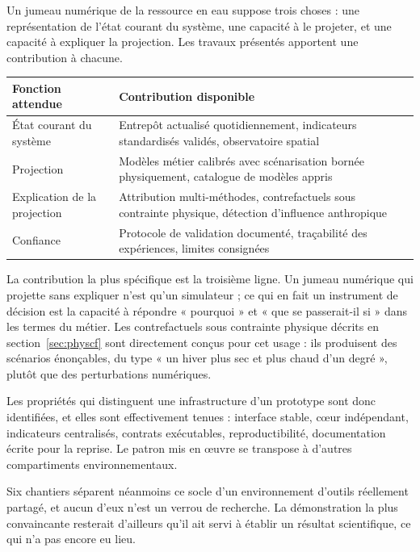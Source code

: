 Un jumeau numérique de la ressource en eau suppose trois choses : une représentation de l'état
courant du système, une capacité à le projeter, et une capacité à expliquer la projection. Les
travaux présentés apportent une contribution à chacune.

\begin{center}
\begin{tabularx}{\textwidth}{@{}lX@{}}
\toprule
\textbf{Fonction attendue} & \textbf{Contribution disponible} \\
\midrule
État courant du système & Entrepôt actualisé quotidiennement, indicateurs standardisés validés,
observatoire spatial \\
Projection & Modèles métier calibrés avec scénarisation bornée physiquement, catalogue de
modèles appris \\
Explication de la projection & Attribution multi-méthodes, contrefactuels sous contrainte
physique, détection d'influence anthropique \\
Confiance & Protocole de validation documenté, traçabilité des expériences, limites consignées \\
\bottomrule
\end{tabularx}
\end{center}

La contribution la plus spécifique est la troisième ligne. Un jumeau numérique qui projette sans
expliquer n'est qu'un simulateur ; ce qui en fait un instrument de décision est la capacité à
répondre « pourquoi » et « que se passerait-il si » dans les termes du métier. Les contrefactuels
sous contrainte physique décrits en section~\ref{sec:physcf} sont directement conçus pour cet
usage : ils produisent des scénarios énonçables, du type « un hiver plus sec et plus chaud d'un
degré », plutôt que des perturbations numériques.

Les propriétés qui distinguent une infrastructure d'un prototype sont donc identifiées, et elles
sont effectivement tenues : interface stable, cœur indépendant, indicateurs centralisés,
contrats exécutables, reproductibilité, documentation écrite pour la reprise. Le patron mis en
œuvre se transpose à d'autres compartiments environnementaux.

Six chantiers séparent néanmoins ce socle d'un environnement d'outils réellement partagé, et
aucun d'eux n'est un verrou de recherche. La démonstration la plus convaincante resterait
d'ailleurs qu'il ait servi à établir un résultat scientifique, ce qui n'a pas encore eu lieu.

